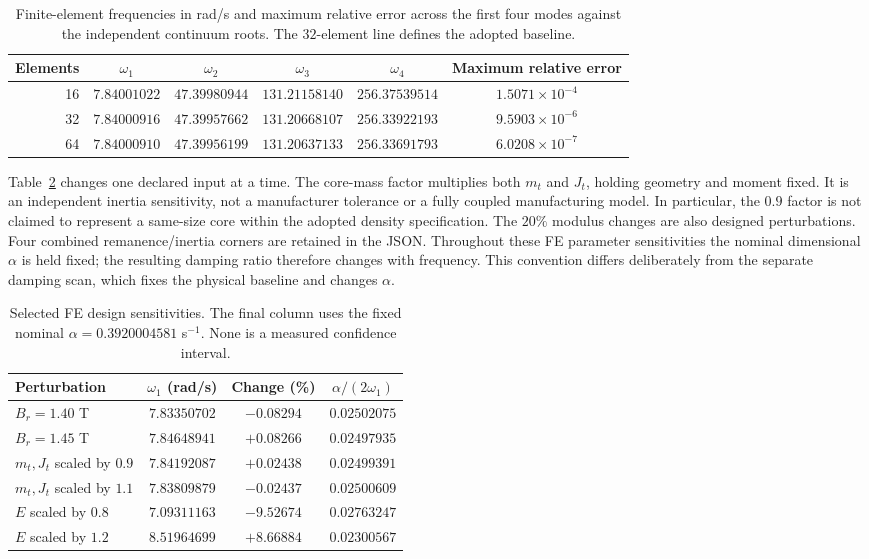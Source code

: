 \begin{table}[t]
\centering
\caption{Finite-element frequencies in rad/s and maximum relative
error across the first four modes against the independent continuum
roots. The $32$-element line defines the adopted baseline.}
\label{sx:fe-table}
\setlength{\tabcolsep}{5pt}
\begin{tabular}{rccccc}
\toprule
Elements & $\omega_1$ & $\omega_2$ & $\omega_3$ & $\omega_4$ & Maximum relative error\\
\midrule
16 & $7.84001022$ & $47.39980944$ & $131.21158140$ & $256.37539514$ & $1.5071\times10^{-4}$ \\
32 & $7.84000916$ & $47.39957662$ & $131.20668107$ & $256.33922193$ & $9.5903\times10^{-6}$ \\
64 & $7.84000910$ & $47.39956199$ & $131.20637133$ & $256.33691793$ & $6.0208\times10^{-7}$ \\
\bottomrule
\end{tabular}
\end{table}

Table~\ref{sx:sensitivity-table} changes one declared input at a time.
The core-mass factor multiplies both $m_t$ and $J_t$, holding geometry
and moment fixed. It is an independent inertia sensitivity, not a
manufacturer tolerance or a fully coupled manufacturing model.
In particular, the $0.9$ factor is not claimed to represent a
same-size core within the adopted density specification. The $20\%$
modulus changes are also designed perturbations. Four combined
remanence/inertia corners are retained in the JSON. Throughout these
FE parameter sensitivities the nominal dimensional $\alpha$ is held
fixed; the resulting damping ratio therefore changes with frequency.
This convention differs deliberately from the separate damping scan,
which fixes the physical baseline and changes $\alpha$.

\begin{table}[t]
\centering
\caption{Selected FE design sensitivities. The final column uses the
fixed nominal $\alpha=0.3920004581$ s$^{-1}$. None is a measured
confidence interval.}
\label{sx:sensitivity-table}
\begin{tabular}{lccc}
\toprule
Perturbation & $\omega_1$ (rad/s) & Change (\%) & $\alpha/(2\omega_1)$\\
\midrule
$B_r=1.40$ T & $7.83350702$ & $-0.08294$ & $0.02502075$ \\
$B_r=1.45$ T & $7.84648941$ & $+0.08266$ & $0.02497935$ \\
$m_t,J_t$ scaled by $0.9$ & $7.84192087$ & $+0.02438$ & $0.02499391$ \\
$m_t,J_t$ scaled by $1.1$ & $7.83809879$ & $-0.02437$ & $0.02500609$ \\
$E$ scaled by $0.8$ & $7.09311163$ & $-9.52674$ & $0.02763247$ \\
$E$ scaled by $1.2$ & $8.51964699$ & $+8.66884$ & $0.02300567$ \\
\bottomrule
\end{tabular}
\end{table}

